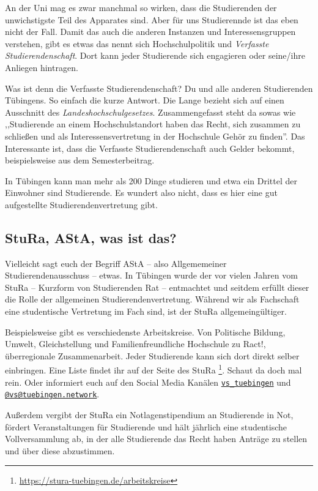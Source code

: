 An der Uni mag es zwar manchmal so wirken, dass die Studierenden der unwichstigste
Teil des Apparates sind.
Aber für uns Studierennde ist das eben nicht der Fall.
Damit das auch die anderen Instanzen und Interessensgruppen verstehen, gibt es
etwas das nennt sich Hochschulpolitik und \textit{Verfasste
Studierendenschaft}. Dort kann jeder Studierende sich engagieren oder seine/ihre
Anliegen hintragen.

Was ist denn die Verfasste Studierendenschaft? Du und alle anderen Studierenden
Tübingens. So einfach die kurze Antwort. Die Lange bezieht sich auf einen
Ausschnitt des \textit{Landeshochschulgesetzes}.  Zusammengefasst steht da
sowas wie ,,Studierende an einem Hochschulstandort haben das Recht, sich zusammen
zu schließen und als Interessensvertretung in der Hochschule Gehör zu finden''.
Das Interessante ist, dass die Verfasste Studierendenschaft auch Gelder bekommt,
beispielsweise aus dem Semesterbeitrag.

In Tübingen kann man mehr als 200 Dinge studieren und etwa ein Drittel der
Einwohner sind Studierende. Es wundert also nicht, dass es hier eine
gut aufgestellte Studierendenvertretung gibt.


\subsection{StuRa, AStA, was ist das?}

Vielleicht sagt euch der Begriff AStA -- also Allgememeiner
Studierendenausschuss -- etwas. In Tübingen wurde der vor vielen Jahren vom
StuRa -- Kurzform von Studierenden Rat -- entmachtet und seitdem erfüllt dieser
die Rolle der allgemeinen Studierendenvertretung. Während wir als Fachschaft
eine studentische Vertretung im Fach sind, ist der StuRa allgemeingültiger.

Beispielsweise gibt es verschiedenste Arbeitskreise. Von Politische Bildung,
Umwelt, Gleichstellung und Familienfreundliche Hochschule zu Ract!, überregionale
Zusammenarbeit. Jeder Studierende kann sich dort direkt selber einbringen.
Eine Liste findet ihr auf der Seite des StuRa
\footnote{\url{https://stura-tuebingen.de/arbeitskreise}}. Schaut da doch mal
rein. Oder informiert euch auf den Social Media Kanälen 
\href{https://www.instagram.com/vs\_tuebingen}{\texttt{vs\_tuebingen}}
und \href{https://toot.kif.rocks/@vs@tuebingen.network}{\texttt{@vs@tuebingen.network}}.


Außerdem vergibt der StuRa ein Notlagenstipendium an Studierende in Not, fördert
Veranstaltungen für Studierende und hält jährlich eine studentische Vollversammlung
ab, in der alle Studierende das Recht haben Anträge zu stellen und über diese abzustimmen.

